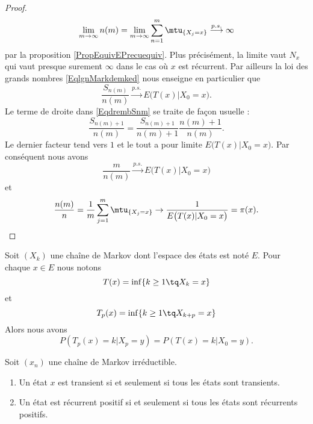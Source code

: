 \begin{proof}
\begin{equation}
         \lim_{m\to \infty}  n(m)=\lim_{m\to \infty} \sum_{n=1}^m\mtu_{\{ X_j=x \}}\stackrel{p.s.}{\longrightarrow}\infty
     \end{equation}
     par la proposition \eqref{PropEquivEPrecuequiv}. Plus précisément, la limite vaut \( N_x\) qui vaut presque surement \( \infty\) dans le cas où \( x\) est récurrent. Par ailleurs la loi des grands nombres \eqref{EqlgnMarkdemked} nous enseigne en particulier que
     \begin{equation}
         \frac{ S_{n(m)} }{ n(m) }\stackrel{p.s.}{\longrightarrow} E\big( T(x)|X_0=x \big).
     \end{equation}
     Le terme de droite dans \eqref{EqdrembSnm} se traite de façon usuelle :
     \begin{equation}
         \frac{ S_{n(m)+1} }{ n(m) }=\frac{ S_{n(m)+1} }{ n(m)+1 }\frac{ n(m)+1 }{ n(m) }.
     \end{equation}
     Le dernier facteur tend vers \( 1\) et le tout a pour limite \( E\big( T(x)|X_0=x \big)\). Par conséquent nous avons
     \begin{equation}
         \frac{ m }{ n(m) }\stackrel{p.s.}{\longrightarrow}E\big( T(x)|X_0=x \big)
     \end{equation}
     et 
     \begin{equation}
         \frac{ n(m) }{ n }=\frac{1}{ m }\sum_{j=1}^m\mtu_{\{ X_j=x \}}\to\frac{1}{ E\big( T(x)|X_0=x \big) }=\pi(x).
     \end{equation}
\end{proof}

\begin{lemma}       \label{LembyftKs}
    Soit $(X_k)$ une chaîne de Markov dont l'espace des états est noté $E$. Pour chaque $ x\in E$ nous notons 
    \begin{equation}
        T(x)=\inf\{ k\geq 1\tq X_k=x \}
    \end{equation}
    et
    \begin{equation}
        T_p(x)=\inf\{ k\geq 1\tq X_{k+p}=x \}
    \end{equation}
    Alors nous avons
    \begin{equation}
        P(T_p(x)=k|X_p=y)=P(T(x)=k|X_0=y).
    \end{equation}
\end{lemma}


\begin{proposition}     \label{PropUyLCzp}
    Soit \( (x_n)\) une chaîne de Markov irréductible.
    \begin{enumerate}
        \item
            Un état \( x\) est transient si et seulement si tous les états sont transients.
        \item
            Un état est récurrent positif  si et seulement si tous les états sont récurrents positifs.
    \end{enumerate}
\end{proposition}

